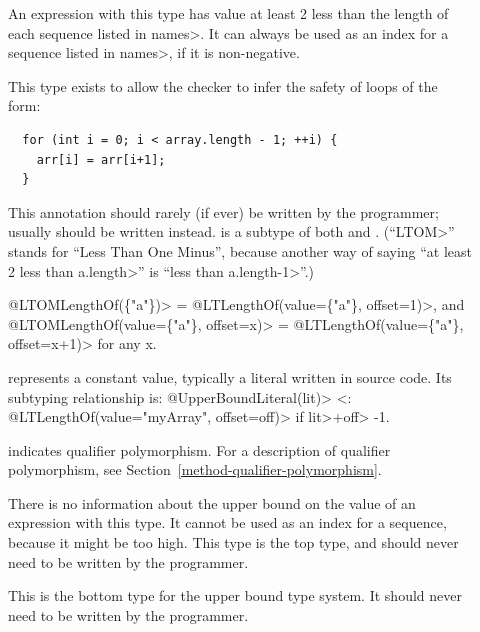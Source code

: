 \begin{description}
\item[]
  An expression with this type
  has value at least 2 less than the length of each sequence listed in \<names>.
  It can always be used as an index for a sequence listed in \<names>, if it is
  non-negative.

  This type exists to allow the checker to infer the safety of loops of
  the form:
\begin{Verbatim}
  for (int i = 0; i < array.length - 1; ++i) {
    arr[i] = arr[i+1];
  }
\end{Verbatim}
  This annotation should rarely (if ever) be written by the programmer; usually
  should be written instead.
   is a subtype of both
   and .
  (``\<LTOM>'' stands for ``Less Than One Minus'', because another way of
  saying ``at least 2 less than \<a.length>'' is ``less than \<a.length-1>''.)

  \<@LTOMLengthOf(\{"a"\})> = \<@LTLengthOf(value=\{"a"\}, offset=1)>, and \\
  \<@LTOMLengthOf(value=\{"a"\}, offset=x)> = \<@LTLengthOf(value=\{"a"\},
  offset=x+1)> for any x.

\item[]
  represents a constant value, typically a literal written in source code.
  Its subtyping relationship is:
  \<@UpperBoundLiteral(lit)> <: \<@LTLengthOf(value="myArray", offset=off)>
  if \<lit>+\<off> \lesym{} -1.

\item[]
  indicates qualifier polymorphism.
  For a description of qualifier polymorphism, see
  Section~\ref{method-qualifier-polymorphism}.

\item[]
  There is no information about the upper bound on the value of an expression with this type.
  It cannot be used as an index for a sequence, because it might be too high.
  This type is the top type, and should never need to be written by the
  programmer.

\item[]
  This is the bottom type for the upper bound type system. It should
  never need to be written by the programmer.

\end{description}

